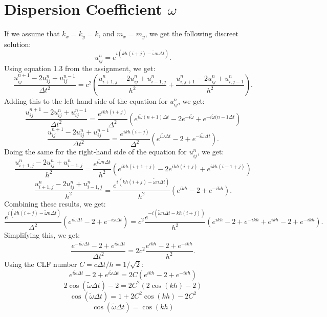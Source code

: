 \documentclass{article}
\begin{document}
\section*{Dispersion Coefficient $ω$}
If we assume that $k_x = k_y = k$, and $m_x = m_y$, we get the following discreet solution:
\[
u^{n}_{ij} = e^{i(kh(i + j) - \tilde{ω}nΔt)}.
\]
Using equation 1.3 from the assignment, we get:
\[
\frac{u^{n+1}_{ij} - 2u^{n}_{ij} + u^{n-1}_{ij}}{Δt^2} = c^2 \left( \frac{u^{n}_{i+1, j} - 2u^{n}_{ij} + u^{n}_{i-1, j}}{h^2} +  \frac{u^{n}_{i, j+1} - 2u^{n}_{ij} + u^{n}_{i, j-1}}{h^2}\right). 
\]
Adding this to the left-hand side of the equation for $u^{n}_{ij}$, we get:
\[
\frac{u^{n+1}_{ij} - 2u^{n}_{ij} + u^{n-1}_{ij}}{Δt^2} = \frac{e^{ikh(i + j)}}{Δ^2} \left( e^{i\tilde{ω}(n+1)Δt} - 2e^{-i\tilde{ω}} + e^{-i\tilde{ω}(n-1Δt}\right) 
\]
\[
\frac{u^{n+1}_{ij} - 2u^{n}_{ij} + u^{n-1}_{ij}}{Δt^2} = \frac{e^{ikh(i + j)}}{Δ^2} \left( e^{i\tilde{ω}Δt} - 2 + e^{-i\tilde{ω}Δt}\right). 
\]
Doing the same for the right-hand side of the equation for $u^{n}_{ij}$, we get:
\[
\frac{u^{n}_{i+1, j} - 2u^{n}_{ij} + u^{n}_{i-1, j}}{h^2} = \frac{e^{i \tilde{ω}nΔt}}{h^2} \left(e^{ikh(i+1+j)} - 2e^{ikh(i+j)} + e^{ikh(i-1+j)}\right)
\]
\[
\frac{u^{n}_{i+1, j} - 2u^{n}_{ij} + u^{n}_{i-1, j}}{h^2} = \frac{e^{i(kh(i + j) - \tilde{ω}nΔt)}}{h^2} \left(e^{ikh} - 2 + e^{-ikh}\right). 
\]
Combining these results, we get:
\[
\frac{e^{i(kh(i + j) - \tilde{ω}nΔt)}}{Δ^2} \left( e^{i\tilde{ω}Δt} - 2 + e^{-i\tilde{ω}Δt}\right) = c^2 \frac{e^{-i(\tilde{ω}nΔt - kh(i+j))}}{h^2} \left(e^{ikh} - 2 + e^{-ikh} + e^{ikh} - 2 + e^{-ikh}\right).
\]
Simplifying this, we get:
\[
\frac{e^{-i \tilde{ω}Δt} - 2 + e^{i \tilde{ω}Δt}}{Δt^2} = 2c^2 \frac{e^{ikh} - 2 + e^{-ikh}}{h^2}. 
\]
Using the CLF number $C = cΔt/h = 1/\sqrt{2}$:
\[
e^{i \tilde{ω}Δt} - 2 + e^{i \tilde{ω}Δt} = 2C \left(e^{ikh} - 2 + e^{-ikh}\right)
\]
\[
2 \cos(\tilde{ω}Δt) - 2 = 2C^2 \left(2 \cos(kh) - 2\right)
\]
\[
\cos(\tilde{ω}Δt) = 1 + 2C^2 \cos(kh) - 2C^2
\]
\[
\cos(\tilde{ω}Δt) = \cos(kh) 
\]
\end{document}
